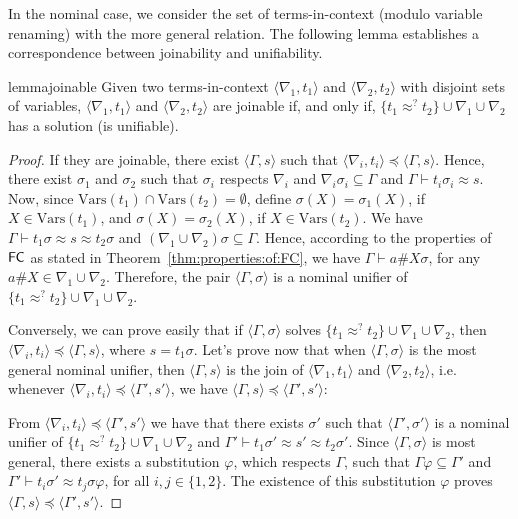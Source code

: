 \documentclass[11pt,a4paper]{amsart}
\theoremstyle{definition}
\newcommand{\vars}{\mathrm{Vars}}
\newcommand{\np}[2]{\langle #1, \allowbreak #2\rangle}
\newcommand{\fe}{{\sf FC}}
\begin{document}
In the nominal case, we consider the set of terms-in-context (modulo variable
renaming) with the more general relation. The following lemma
establishes a correspondence between joinability and unifiability.

\begin{restatable}{lemma}{joinable}
 \label{lemma:unif:join}
Given two terms-in-context $\np{\nabla_1}{t_1}$ and
$\np{\nabla_2}{t_2}$ with disjoint sets of variables,
$\np{\nabla_1}{t_1}$ and $\np{\nabla_2}{t_2}$ are joinable if, and
only if, $\{t_1\approx^? t_2\}\cup\nabla_1\cup\nabla_2$ has a solution
(is unifiable).
\end{restatable}

\begin{proof}
If they are joinable, there exist $\np{\Gamma}{s}$ such that
$\np{\nabla_i}{t_i} \preceq \np{\Gamma}{s}$. Hence, there exist
$\sigma_1$ and $\sigma_2$ such that $\sigma_i$ respects $\nabla_i$ and
$\nabla_i\sigma_i\subseteq\Gamma$ and $\Gamma\vdash t_i\sigma_i
\approx s$.  Now, since $\vars(t_1) \cap \vars(t_2)=\emptyset$, define
$\sigma(X) = \sigma_1(X)$, if $X\in\vars(t_1)$, and $\sigma(X) =
\sigma_2(X)$, if $X\in\vars(t_2)$. We have $\Gamma\vdash
t_1\sigma\approx s\approx t_2\sigma$ and
$(\nabla_1\cup\nabla_2)\sigma\subseteq\Gamma$.  Hence, according to
the properties of $\fe$ as stated in Theorem~\ref{thm:properties:of:FC}, we have $\Gamma\vdash a\#X\sigma$, for any $a\#X\in
\nabla_1\cup\nabla_2$.  Therefore, the pair
$\langle\Gamma,\sigma\rangle$ is a nominal unifier of $\{t_1\approx^?
t_2\}\cup\nabla_1\cup\nabla_2$.

Conversely, we can prove easily that if $\langle\Gamma,\sigma\rangle$
solves $\{t_1\approx^?  t_2\}\cup\nabla_1\cup\nabla_2$, then
$\np{\nabla_i}{t_i} \preceq \np{\Gamma}{s}$, where $s=t_1\sigma$.
Let's prove now that when $\langle\Gamma,\sigma\rangle$ is the most
general nominal unifier, then $\np{\Gamma}{s}$ is the join of
$\np{\nabla_1}{t_1}$ and $\np{\nabla_2}{t_2}$, i.e.  whenever
$\np{\nabla_i}{t_i}\preceq\np{\Gamma'}{s'}$, we have
$\np{\Gamma}{s}\preceq\np{\Gamma'}{s'}$:

From $\np{\nabla_i}{t_i}\preceq\np{\Gamma'}{s'}$ we have that there exists
$\sigma'$ such that $\langle\Gamma',\sigma'\rangle$ is a nominal
unifier of $\{t_1\approx^?  t_2\}\cup\nabla_1\cup\nabla_2$ and
$\Gamma'\vdash t_1\sigma'\approx s' \approx t_2\sigma'$. Since $\langle\Gamma,\sigma\rangle$ is most general, there exists a
substitution $\varphi$, which respects $\Gamma$, such that $\Gamma\varphi\subseteq\Gamma'$ and
$\Gamma'\vdash t_i\sigma' \approx t_j\sigma\varphi $, for all $i,j\in\{1,2\}$.  The existence of this
substitution $\varphi$ proves
$\np{\Gamma}{s}\preceq\np{\Gamma'}{s'}$.
\end{proof}
\end{document}
